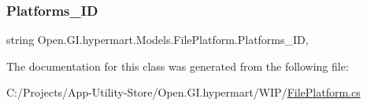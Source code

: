 \subsubsection{\texorpdfstring{Platforms\+\_\+\+ID}{Platforms\_ID}}
{\footnotesize\ttfamily string Open.\+G\+I.\+hypermart.\+Models.\+File\+Platform.\+Platforms\+\_\+\+ID\hspace{0.3cm}{\ttfamily [get]}, {\ttfamily [set]}}



The documentation for this class was generated from the following file\+:\begin{DoxyCompactItemize}
\item 
C\+:/\+Projects/\+App-\/\+Utility-\/\+Store/\+Open.\+G\+I.\+hypermart/\+W\+I\+P/\hyperlink{_file_platform_8cs}{File\+Platform.\+cs}\end{DoxyCompactItemize}
